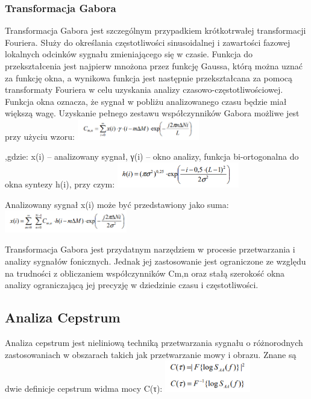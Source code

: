 \documentclass[a4paper,titleauthor]{mwart}
\begin{document}
\subsubsection{Transformacja Gabora}
Transformacja Gabora  jest szczególnym przypadkiem krótkotrwałej transformacji Fouriera. Służy do określania częstotliwości sinusoidalnej i zawartości fazowej lokalnych odcinków sygnału zmieniającego się w czasie. Funkcja do przekształcenia jest najpierw mnożona przez funkcję Gaussa, którą można uznać za funkcję okna, a wynikowa funkcja jest następnie przekształcana za pomocą transformaty Fouriera w celu uzyskania analizy czasowo-częstotliwościowej. Funkcja okna oznacza, że sygnał w pobliżu analizowanego czasu będzie miał większą wagę. 
Uzyskanie pełnego zestawu współczynników Gabora możliwe jest przy użyciu wzoru:\newline
\includegraphics[width=0.4\textwidth]{transG1.png}

,gdzie: x(i) – analizowany sygnał, γ(i) – okno analizy, funkcja bi-ortogonalna do okna syntezy h(i), przy czym:\newline
	\includegraphics[width=0.4\textwidth]{transG2.png}

Analizowany sygnał x(i) może być przedstawiony jako suma:\newline
	\includegraphics[width=0.4\textwidth]{transG3.png}

Transformacja Gabora jest przydatnym narzędziem w procesie przetwarzania i analizy sygnałów fonicznych. Jednak jej zastosowanie jest ograniczone ze względu na trudności z obliczaniem współczynników Cm,n oraz stałą szerokość okna analizy ograniczającą jej precyzję w dziedzinie czasu i częstotliwości.
\subsection{Analiza Cepstrum}
Analiza cepstrum jest nieliniową techniką przetwarzania sygnału o różnorodnych zastosowaniach w obszarach takich jak przetwarzanie mowy i obrazu.
Znane są dwie definicje cepstrum widma mocy C(τ):\newline
	\includegraphics[width=0.28\textwidth]{Acepstrum1.png}
\end{document}
